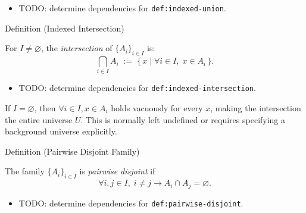 \begin{dependencies}
\begin{itemize}
  \item TODO: determine dependencies for \texttt{def:indexed-union}.
\end{itemize}
\end{dependencies}

\begin{definitionbox}{Definition (Indexed Intersection)}
\begin{definition}\label{def:indexed-intersection}
For $I \neq \varnothing$, the \emph{intersection} of $\{A_i\}_{i \in I}$ is:
\[
\bigcap_{i \in I} A_i
\;:=\;
\{\, x \mid \forall i \in I,\; x \in A_i \,\}.
\]
\end{definition}
\end{definitionbox}

\begin{dependencies}
\begin{itemize}
  \item TODO: determine dependencies for \texttt{def:indexed-intersection}.
\end{itemize}
\end{dependencies}

\begin{remark*}
If $I = \varnothing$, then $\forall i \in I, x \in A_i$ holds vacuously for
every $x$, making the intersection the entire universe $U$. This is normally
left undefined or requires specifying a background universe explicitly.
\end{remark*}

\begin{definitionbox}{Definition (Pairwise Disjoint Family)}
\begin{definition}\label{def:pairwise-disjoint}
The family $\{A_i\}_{i \in I}$ is \emph{pairwise disjoint} if
\[
\forall i,j \in I,\;
i \neq j \rightarrow A_i \cap A_j = \varnothing.
\]
\end{definition}
\end{definitionbox}

\begin{dependencies}
\begin{itemize}
  \item TODO: determine dependencies for \texttt{def:pairwise-disjoint}.
\end{itemize}
\end{dependencies}

